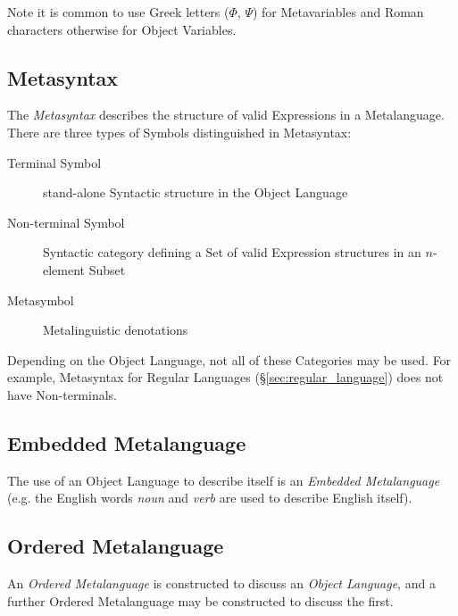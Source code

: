 Note it is common to use Greek letters ($\Phi$, $\Psi$) for
Metavariables and Roman characters otherwise for Object Variables.



\subsection{Metasyntax}\label{sec:metasyntax}

The \emph{Metasyntax} describes the structure of valid Expressions in
a Metalanguage. There are three types of Symbols distinguished in
Metasyntax:
\begin{description}
  \item [Terminal Symbol] stand-alone Syntactic structure in the
    Object Language
  \item [Non-terminal Symbol] Syntactic category defining a Set of
    valid Expression structures in an $n$-element Subset
  \item [Metasymbol] Metalinguistic denotations
\end{description}
Depending on the Object Language, not all of these Categories may be
used. For example, Metasyntax for Regular Languages
(\S\ref{sec:regular_language}) does not have Non-terminals.



\subsection{Embedded Metalanguage}\label{sec:embedded_metalanguage}

The use of an Object Language to describe itself is an \emph{Embedded
  Metalanguage} (e.g. the English words \emph{noun} and \emph{verb}
are used to describe English itself).



\subsection{Ordered Metalanguage}\label{sec:ordered_metalanguage}

An \emph{Ordered Metalanguage} is constructed to discuss an
\emph{Object Language}, and a further Ordered Metalanguage may be
constructed to discuss the first.

